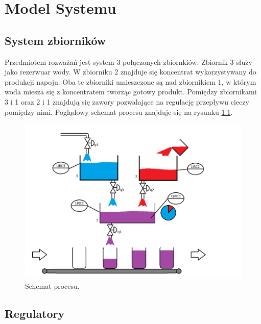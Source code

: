\chapter{Model Systemu}
\section{System zbiorników}
\indent Przedmiotem rozważań jest system 3 połączonych zbiornkiów. Zbiornik 3 służy jako rezerwuar wody. W zbiorniku 2 znajduje się koncentrat wykorzystywany do produkcji napoju. Oba te zbiorniki umieszczone są nad zbiornikiem 1, w którym woda miesza się z koncentratem tworząc gotowy produkt. Pomiędzy zbiornikami 3 i 1 oraz 2 i 1 znajdują się zawory pozwalające na regulację przepływu cieczy pomiędzy nimi. Poglądowy schemat procesu znajduje się na rysunku \ref{fig:Proces}.
\begin{figure}[H]
	\centering
	\includegraphics[scale = 0.4]{fig/Proces_schema_updated.png}
	\caption{Schemat procesu.}
	\label{fig:Proces}
\end{figure}

\section{Regulatory}
